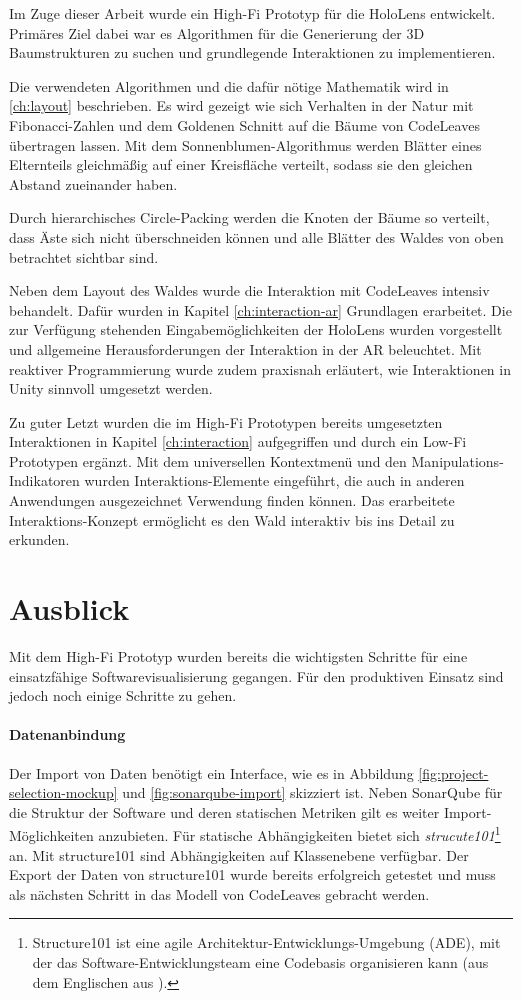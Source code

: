 Im Zuge dieser Arbeit wurde ein High-Fi Prototyp für die HoloLens entwickelt. Primäres Ziel dabei war es Algorithmen für die Generierung der 3D Baumstrukturen zu suchen und grundlegende Interaktionen zu implementieren.

Die verwendeten Algorithmen und die dafür nötige Mathematik wird in \ref{ch:layout} beschrieben. Es wird gezeigt wie sich Verhalten in der Natur mit Fibonacci-Zahlen und dem Goldenen Schnitt auf die Bäume von CodeLeaves übertragen lassen. Mit dem Sonnenblumen-Algorithmus werden Blätter eines Elternteils gleichmäßig auf einer Kreisfläche verteilt, sodass sie den gleichen Abstand zueinander haben.

Durch hierarchisches Circle-Packing werden die Knoten der Bäume so verteilt, dass Äste sich nicht überschneiden können und alle Blätter des Waldes von oben betrachtet sichtbar sind.

Neben dem Layout des Waldes wurde die Interaktion mit CodeLeaves intensiv behandelt. Dafür wurden in Kapitel \ref{ch:interaction-ar} Grundlagen erarbeitet. Die zur Verfügung stehenden Eingabemöglichkeiten der HoloLens wurden vorgestellt und allgemeine Herausforderungen der Interaktion in der AR beleuchtet. Mit reaktiver Programmierung wurde zudem praxisnah erläutert, wie Interaktionen in Unity sinnvoll umgesetzt werden.

Zu guter Letzt wurden die im High-Fi Prototypen bereits umgesetzten Interaktionen in Kapitel \ref{ch:interaction} aufgegriffen und durch ein Low-Fi Prototypen ergänzt. Mit dem universellen Kontextmenü und den Manipulations-Indikatoren wurden Interaktions-Elemente eingeführt, die auch in anderen Anwendungen ausgezeichnet Verwendung finden können. Das erarbeitete Interaktions-Konzept ermöglicht es den Wald interaktiv bis ins Detail zu erkunden.

\section{Ausblick}

Mit dem High-Fi Prototyp wurden bereits die wichtigsten Schritte für eine einsatzfähige Softwarevisualisierung gegangen. Für den produktiven Einsatz sind jedoch noch einige Schritte zu gehen.

\paragraph{Datenanbindung} 

Der Import von Daten benötigt ein Interface, wie es in Abbildung \ref{fig:project-selection-mockup} und \ref{fig:sonarqube-import} skizziert ist. Neben SonarQube für die Struktur der Software und deren statischen Metriken gilt es weiter Import-Möglichkeiten anzubieten. Für statische Abhängigkeiten bietet sich \textit{strucute101}\footnote{Structure101 ist eine agile Architektur-Entwicklungs-Umgebung (ADE), mit der das Software-Entwicklungsteam eine Codebasis organisieren kann (aus dem Englischen aus \cite{headway2017structure101}).} an. Mit structure101 sind Abhängigkeiten auf Klassenebene verfügbar. Der Export der Daten von structure101 wurde bereits erfolgreich getestet und muss als nächsten Schritt in das Modell von CodeLeaves gebracht werden.

